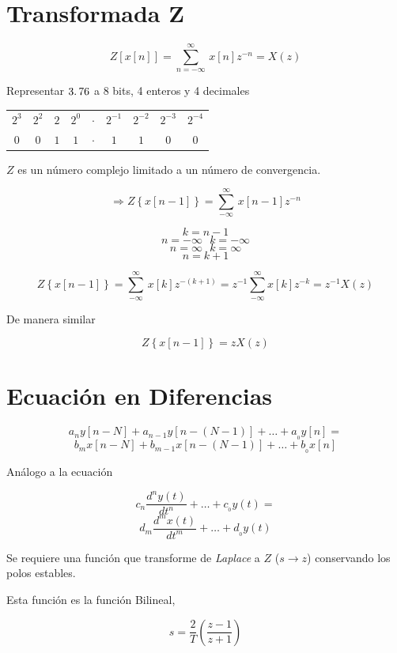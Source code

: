 \section{Transformada Z}

$$Z\left[ x[n] \right] = \displaystyle \sum_{n = -\infty}^{\infty}\, x[n]z^{-n} = X(z)$$

Representar $3\ldotp76$ a 8 bits, 4 enteros y 4 decimales

\begin{table}
	\begin{tabular}{ccccccccc}
		$2^3$ & $2^2$ & $2$ & $2^0$ & $\cdotp$ & $2^{-1}$ & $2^{-2}$ & $2^{-3}$ & $2^{-4}$    \\
		$0$ & $0$ & $1$ & $1$ & $\cdotp$ & $1$ & $1$ & $0$ & $0$
	\end{tabular}
\end{table}

$Z$ es un número complejo limitado a un número de convergencia.

$$\Rightarrow Z\left\lbrace x[n - 1] \right\rbrace = \displaystyle \sum_{-\infty}^{\infty}\, x[n - 1]z^{-n}$$

$$k = n - 1$$
$$n = -\infty \:\:\: k = -\infty$$
$$n = \infty \:\:\: k = \infty$$
$$n = k + 1$$

$$Z\left\lbrace x[n - 1] \right\rbrace = \displaystyle \sum_{- \infty}^{\infty} \, x[k]z^{-(k + 1)} = z^{-1} \displaystyle \sum_{-\infty}^{\infty} x[k]z^{-k} = z^{-1} X(z)$$

De manera similar

$$Z\left\lbrace x[n - 1] \right\rbrace = zX(z)$$


\section{Ecuación en Diferencias}

$$a_{n}y[n - N] + a_{n - 1}y[n - (N - 1)] + \ldots + a_{_0}y[n] = $$
$$b_{m}x[n - N] + b_{m - 1}x[n - (N - 1)] + \ldots + b_{_0}x[n]$$
 
Análogo a la ecuación

$$c_{n} \dfrac{d^{n} y(t)}{dt^{n}} + \ldots + c_{_0}y(t) = $$
$$d_{m} \dfrac{d^{m} x(t)}{dt^{m}} + \ldots + d_{_0}y(t)$$


Se requiere una función que transforme de \textit{Laplace} a $Z$ ($s \rightarrow z$) conservando los polos estables.

Esta función es la función Bilineal,

$$s = \dfrac{2}{T} \left( \dfrac{z - 1}{z + 1} \right)$$

